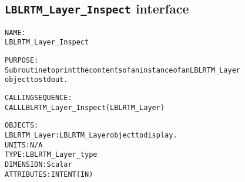 \subsection{\texttt{LBLRTM\_Layer\_Inspect} interface}
  \label{sec:LBLRTM_Layer_Inspect_interface}
  \begin{alltt}
 
  NAME:
        LBLRTM_Layer_Inspect
 
  PURPOSE:
        Subroutine to print the contents of an instance of an LBLRTM_Layer
        object to stdout.
 
  CALLING SEQUENCE:
        CALL LBLRTM_Layer_Inspect( LBLRTM_Layer )
 
  OBJECTS:
        LBLRTM_Layer:  LBLRTM_Layer object to display.
                       UNITS:      N/A
                       TYPE:       LBLRTM_Layer_type
                       DIMENSION:  Scalar
                       ATTRIBUTES: INTENT(IN)
 
  \end{alltt}
